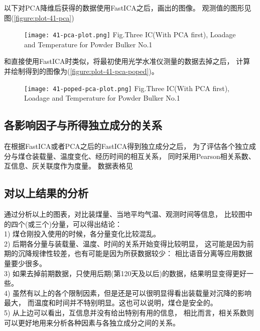 以下对PCA降维后获得的数据使用FastICA之后，画出的图像。
观测值的图形见图(\ref{figure:plot-41-pca})

\begin{figure}[!htbp]
   \centering
   \texttt{[image: 41-pca-plot.png]}
			{Fig.}{Three IC(With PCA first), Loadage and Temperature for Powder Bulker No.1}
\end{figure}

和直接使用FastICA时类似，将最初使用光学水准仪测量的数据去掉之后，
计算并绘制得到的图像为(\ref{figure:plot-41-pca-poped})。
\begin{figure}[!htbp]
   \centering
   \texttt{[image: 41-poped-pca-plot.png]}
			{Fig.}{Three IC(With PCA first), Loadage and Temperature for Powder Bulker No.1}
\end{figure}


\subsection{各影响因子与所得独立成分的关系}
在根据FastICA或者PCA之后的FastICA得到独立成分之后，
为了评估各个独立成分与煤仓装载量、温度变化、经历时间的相互关系，
同时采用Pearson相关系数、互信息、灰关联度作为度量。
数据表格见 

%
%

\subsection{对以上结果的分析}
通过分析以上的图表，对比装煤量、当地平均气温、观测时间等信息，
比较图中的四个(或三个)分量，可以得出结论：\\
    1) 煤仓刚投入使用的时候，各分量变化比较混乱。\\
    2) 后期各分量与装载量、温度、时间的关系开始变得比较明显，
	这可能是因为前期的沉降规律性较差，也有可能是因为所获数据较少：
	相比语音分离等应用数据量要少很多。\\
    3) 如果去掉前期数据，只使用后期(第120天及以后)的数据，结果明显变得更好一些。\\
    4) 虽然有以上的各个限制因素，但是还是可以很明显得看出装载量对沉降的影响最大，
	而温度和时间并不特别明显。这也可以说明，煤仓是安全的。\\
    5) 从上边可以看出，互信息并没有给出特别有用的信息，
	相比而言，相关系数则可以更好地用来分析各种因素与各独立成分之间的关系。\\

